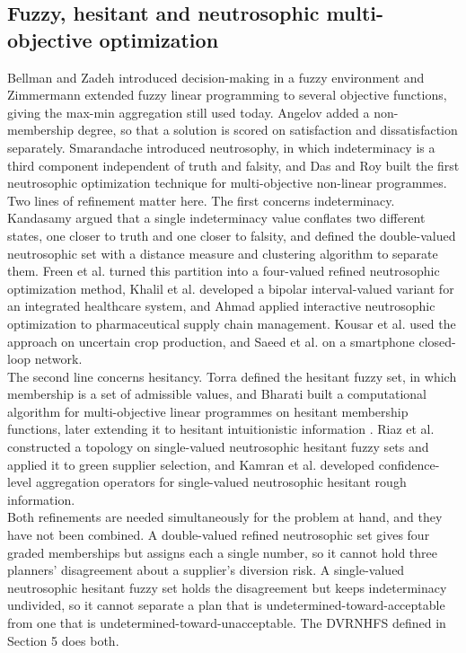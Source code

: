 \documentclass[a4paper]{elsarticle}
\begin{document}
{\subsection{Fuzzy, hesitant and neutrosophic multi-objective optimization}
\label{subsec:fuzzy}
Bellman and Zadeh \cite{Bellman:1970} introduced decision-making in a fuzzy environment and Zimmermann \cite{Zimmermann:1978} extended fuzzy linear programming to several objective functions, giving the max-min aggregation still used today. Angelov \cite{Angelov:1997} added a non-membership degree, so that a solution is scored on satisfaction and dissatisfaction separately. Smarandache \cite{Smarandache:1998} introduced neutrosophy, in which indeterminacy is a third component independent of truth and falsity, and Das and Roy \cite{Das:2015} built the first neutrosophic optimization technique for multi-objective non-linear programmes.\\
Two lines of refinement matter here. The first concerns indeterminacy. Kandasamy \cite{Kandasamy:2018} argued that a single indeterminacy value conflates two different states, one closer to truth and one closer to falsity, and defined the double-valued neutrosophic set with a distance measure and clustering algorithm to separate them. Freen et al. \cite{Freen:2020} turned this partition into a four-valued refined neutrosophic optimization method, Khalil et al. \cite{Khalil:2022} developed a bipolar interval-valued variant for an integrated healthcare system, and Ahmad \cite{Ahmad:2022} applied interactive neutrosophic optimization to pharmaceutical supply chain management. Kousar et al. \cite{Kousar:2023} used the approach on uncertain crop production, and Saeed et al. \cite{Saeed:2024} on a smartphone closed-loop network.\\
The second line concerns hesitancy. Torra \cite{Torra:2010} defined the hesitant fuzzy set, in which membership is a set of admissible values, and Bharati \cite{Bharati:2018} built a computational algorithm for multi-objective linear programmes on hesitant membership functions, later extending it to hesitant intuitionistic information \cite{Bharati:2022}. Riaz et al. \cite{Riaz:2022} constructed a topology on single-valued neutrosophic hesitant fuzzy sets and applied it to green supplier selection, and Kamran et al. \cite{Kamran:2023} developed confidence-level aggregation operators for single-valued neutrosophic hesitant rough information.\\
Both refinements are needed simultaneously for the problem at hand, and they have not been combined. A double-valued refined neutrosophic set gives four graded memberships but assigns each a single number, so it cannot hold three planners' disagreement about a supplier's diversion risk. A single-valued neutrosophic hesitant fuzzy set holds the disagreement but keeps indeterminacy undivided, so it cannot separate a plan that is undetermined-toward-acceptable from one that is undetermined-toward-unacceptable. The DVRNHFS defined in Section 5 does both.

}
\end{document}
